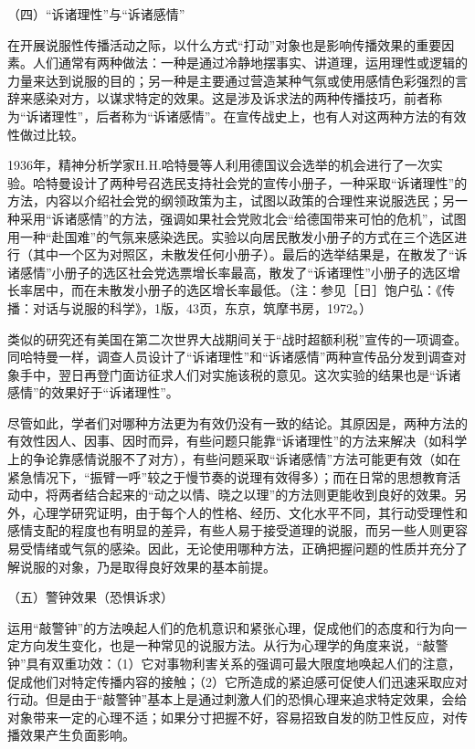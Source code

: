 \documentclass[UTF8,12pt]{ctexart}
\numberwithin{equation}{section} %
\numberwithin{figure}{section}
\numberwithin{table}{section}
\begin{document}
	（四）“诉诸理性”与“诉诸感情”
	
	在开展说服性传播活动之际，以什么方式“打动”对象也是影响传播效果的重要因素。人们通常有两种做法：一种是通过冷静地摆事实、讲道理，运用理性或逻辑的力量来达到说服的目的；另一种是主要通过营造某种气氛或使用感情色彩强烈的言辞来感染对方，以谋求特定的效果。这是涉及诉求法的两种传播技巧，前者称为“诉诸理性”，后者称为“诉诸感情”。在宣传战史上，也有人对这两种方法的有效性做过比较。
	
	1936年，精神分析学家H.H.哈特曼等人利用德国议会选举的机会进行了一次实验。哈特曼设计了两种号召选民支持社会党的宣传小册子，一种采取“诉诸理性”的方法，内容以介绍社会党的纲领政策为主，试图以政策的合理性来说服选民；另一种采用“诉诸感情”的方法，强调如果社会党败北会“给德国带来可怕的危机”，试图用一种“赴国难”的气氛来感染选民。实验以向居民散发小册子的方式在三个选区进行（其中一个区为对照区，未散发任何小册子）。最后的选举结果是，在散发了“诉诸感情”小册子的选区社会党选票增长率最高，散发了“诉诸理性”小册子的选区增长率居中，而在未散发小册子的选区增长率最低。（注：参见［日］饱户弘：《传播：对话与说服的科学》，1版，43页，东京，筑摩书房，1972。）
	
	类似的研究还有美国在第二次世界大战期间关于“战时超额利税”宣传的一项调查。同哈特曼一样，调查人员设计了“诉诸理性”和“诉诸感情”两种宣传品分发到调查对象手中，翌日再登门面访征求人们对实施该税的意见。这次实验的结果也是“诉诸感情”的效果好于“诉诸理性”。
	
	尽管如此，学者们对哪种方法更为有效仍没有一致的结论。其原因是，两种方法的有效性因人、因事、因时而异，有些问题只能靠“诉诸理性”的方法来解决（如科学上的争论靠感情说服不了对方），有些问题采取“诉诸感情”方法可能更有效（如在紧急情况下，“振臂一呼”较之于慢节奏的说理有效得多）；而在日常的思想教育活动中，将两者结合起来的“动之以情、晓之以理”的方法则更能收到良好的效果。另外，心理学研究证明，由于每个人的性格、经历、文化水平不同，其行动受理性和感情支配的程度也有明显的差异，有些人易于接受道理的说服，而另一些人则更容易受情绪或气氛的感染。因此，无论使用哪种方法，正确把握问题的性质并充分了解说服的对象，乃是取得良好效果的基本前提。
	
	（五）警钟效果（恐惧诉求）
	
	运用“敲警钟”的方法唤起人们的危机意识和紧张心理，促成他们的态度和行为向一定方向发生变化，也是一种常见的说服方法。从行为心理学的角度来说，“敲警钟”具有双重功效：（1）它对事物利害关系的强调可最大限度地唤起人们的注意，促成他们对特定传播内容的接触；（2）它所造成的紧迫感可促使人们迅速采取应对行动。但是由于“敲警钟”基本上是通过刺激人们的恐惧心理来追求特定效果，会给对象带来一定的心理不适；如果分寸把握不好，容易招致自发的防卫性反应，对传播效果产生负面影响。
	
\end{document}
